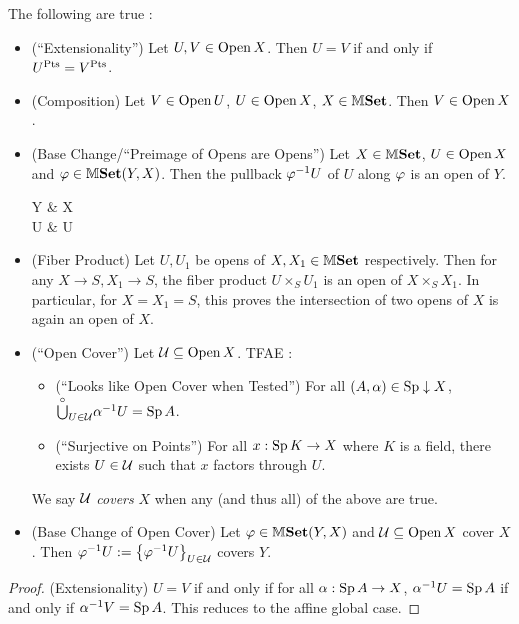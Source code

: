 \documentclass[../main.tex]{subfiles}
\begin{document}
\begin{prop}
  
  The following are true : \begin{itemize}
    \item (``Extensionality'')
    Let $U, V \in \operatorname{Open} X$.
    Then $U = V$ if and only if $U^{\mathrm{Pts}} = V^{\mathrm{Pts}}$.
    \item (Composition)
    Let $V \in \operatorname{Open} U$, $U \in \operatorname{Open} X$, $X \in \mathbb{M}\mathbf{Set}$.
    Then $V \in \operatorname{Open} X$.
    \item (Base Change/``Preimage of Opens are Opens'') 
    Let $X \in \mathbb{M}\mathbf{Set}$, $U \in \operatorname{Open} X$ and $\varphi \in \mathbb{M}\mathbf{Set}(Y,X)$.
    Then the pullback $\varphi^{-1} U$ of $U$ along $\varphi$ is 
    an open of $Y$.
    \begin{cd}
      Y \ar[r,"\ph"] & X \\
      \ph\inv U \ar[u] \ar[r] & U \ar[u]
    \end{cd}
    \item (Fiber Product)
    Let $U,U_1$ be opens of $X,X_1 \in \mathbb{M}\mathbf{Set}$ respectively.
    Then for any $X \to S, X_1 \to S$, 
    the fiber product $U \times_S U_1$ is an open of $X \times_S X_1$.
    In particular, for $X = X_1 = S$,
    this proves the intersection of two opens of $X$ is 
    again an open of $X$.
    \item (``Open Cover'')
    Let $\mathcal{U} \subseteq \operatorname{Open} X$. TFAE : 
    \begin{itemize}
      \item (``Looks like Open Cover when Tested'') 
      For all $(A,\alpha) \in \operatorname{Sp}\downarrow X$,
      $\overset{\circ}{\bigcup}_{U \in \mathcal{U}} \alpha^{-1} U = \operatorname{Sp} A$. 
      \item (``Surjective on Points'')
      For all $x : \operatorname{Sp} K \to X$ where $K$ is a field, 
      there exists $U \in \mathcal{U}$ such that $x$ factors through $U$.
    \end{itemize}
    We say $\mathcal{U}$ \emph{covers} $X$ when 
    any (and thus all) of the above are true. 
    \item (Base Change of Open Cover)
    Let $\varphi \in \mathbb{M}\mathbf{Set}(Y,X)$ and $\mathcal{U} \subseteq \operatorname{Open} X$ cover $X$.
    Then $\varphi^{-1} U := \left\{\varphi^{-1} U\right\}_{U \in \mathcal{U}}$ covers $Y$.
  \end{itemize}
\end{prop}
\begin{proof}
  (Extensionality) $U = V$ if and only if 
  for all $\alpha : \operatorname{Sp} A \to X$, 
  $\alpha^{-1} U = \operatorname{Sp} A$ if and only if $\alpha^{-1} V = \operatorname{Sp} A$. 
  This reduces to the affine global case.
\end{proof}
\end{document}
